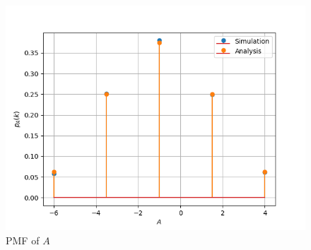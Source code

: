 \documentclass[journal,12pt,twocolumn]{IEEEtran}
\theoremstyle{remark}
\begin{document}
\begin{figure}
\centering
\includegraphics[width=\columnwidth]{ncert/11/16/3/7a/figs/figure1.png}
\caption{ PMF of $A$}
\end{figure}
\end{document}
